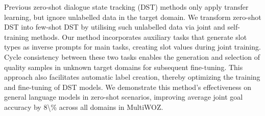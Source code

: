 Previous zero-shot dialogue state tracking (DST) methods only apply transfer learning, but ignore unlabelled data in the target domain. We transform zero-shot DST into few-shot DST by utilising such unlabelled data via joint and self-training methods. Our method incorporates auxiliary tasks that generate slot types as inverse prompts for main tasks, creating slot values during joint training.  Cycle consistency between these two tasks enables the generation and selection of quality samples in unknown target domains for subsequent fine-tuning. This approach also facilitates automatic label creation, thereby optimizing the training and fine-tuning of DST models. We demonstrate this method's effectiveness on general language models in zero-shot scenarios, improving average joint goal accuracy by 8\textbackslash{}\% across all domains in MultiWOZ.